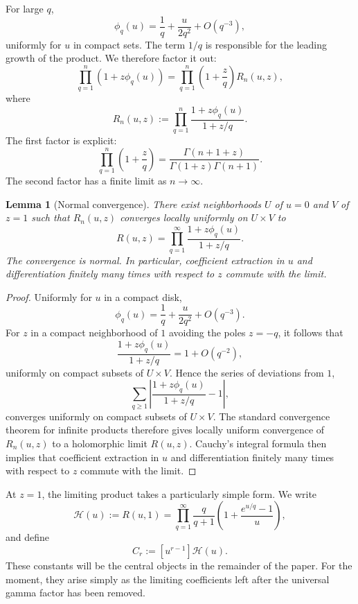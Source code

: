 \documentclass[11pt]{article}
\newtheorem{lemma}[theorem]{Lemma}
\theoremstyle{definition}
\begin{document}
For large $q$,
\[
        \phi_q(u)
        =
        \frac1q+\frac{u}{2q^2}+O(q^{-3}),
\]
uniformly for $u$ in compact sets.  The term $1/q$ is responsible for
the leading growth of the product.  We therefore factor it out:
\begin{equation}\label{eq:factor}
 \prod_{q=1}^n(1+z\phi_q(u))
 =
 \prod_{q=1}^n\left(1+\frac zq\right)
 R_n(u,z),
\end{equation}
where
\[
 R_n(u,z)
 :=
 \prod_{q=1}^n
 \frac{1+z\phi_q(u)}{1+z/q}.
\]
The first factor is explicit:
\begin{equation}\label{eq:gamma}
 \prod_{q=1}^n\left(1+\frac zq\right)
 =
 \frac{\Gamma(n+1+z)}
 {\Gamma(1+z)\Gamma(n+1)}.
\end{equation}
The second factor has a finite limit as $n\to\infty$.

\begin{lemma}[Normal convergence]\label{lem:normal}
There exist neighborhoods $U$ of $u=0$ and $V$ of $z=1$ such that
$R_n(u,z)$ converges locally uniformly on $U\times V$ to
\[
 R(u,z)
 =
 \prod_{q=1}^\infty
 \frac{1+z\phi_q(u)}{1+z/q}.
\]
The convergence is normal.  In particular, coefficient extraction
in $u$ and differentiation finitely many times with respect to $z$
commute with the limit.
\end{lemma}

\begin{proof}
Uniformly for $u$ in a compact disk,
\[
 \phi_q(u)
 =
 \frac1q+\frac{u}{2q^2}+O(q^{-3}).
\]
For $z$ in a compact neighborhood of $1$ avoiding the poles
$z=-q$, it follows that
\[
 \frac{1+z\phi_q(u)}{1+z/q}
 =
 1+O(q^{-2}),
\]
uniformly on compact subsets of $U\times V$.  Hence the series of
deviations from $1$,
\[
 \sum_{q\geq1}
 \left|
 \frac{1+z\phi_q(u)}{1+z/q}-1
 \right|,
\]
converges uniformly on compact subsets of $U\times V$.  The standard
convergence theorem for infinite products therefore gives locally
uniform convergence of $R_n(u,z)$ to a holomorphic limit $R(u,z)$.
Cauchy's integral formula then implies that coefficient extraction
in $u$ and differentiation finitely many times with respect to $z$
commute with the limit.
\end{proof}

At $z=1$, the limiting product takes a particularly simple form.
We write
\begin{equation}\label{eq:Hcal}
 \mathcal H(u)
 :=
 R(u,1)
 =
 \prod_{q=1}^\infty
 \frac{q}{q+1}
 \left(
 1+\frac{e^{u/q}-1}{u}
 \right),
\end{equation}
and define
\begin{equation}\label{eq:Crdef}
        C_r:=[u^{r-1}]\mathcal H(u).
\end{equation}
These constants will be the central objects in the remainder of the
paper.  For the moment, they arise simply as the limiting
coefficients left after the universal gamma factor has been removed.
\end{document}
